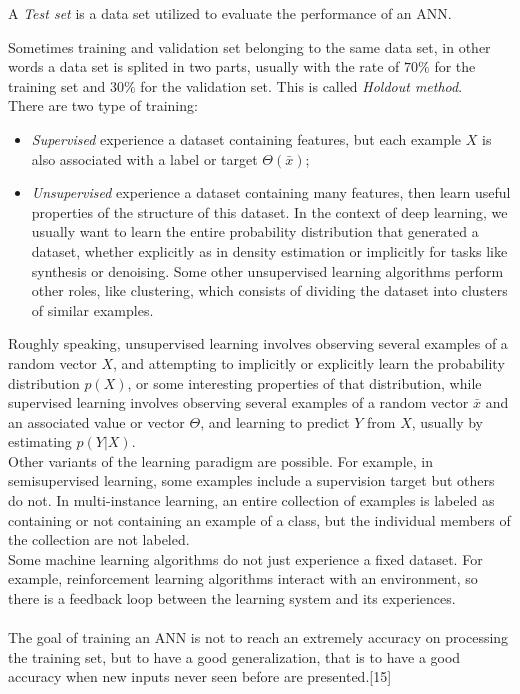 \begin{defn}
A \emph{Test set} is a data set utilized to evaluate the performance of an ANN.
\end{defn}

Sometimes training and validation set belonging to the same data set, in other words a data set is splited in two parts, usually with the rate of $70 \%$ for the training set and $30 \%$ for the validation set. This is called \emph{Holdout method}.\\



There are two type of training:
\begin{itemize}
\item \emph{Supervised} experience a dataset containing features, but each example $X$ is also associated with a label or target $\Theta(\bar{x})$;

\item \emph{Unsupervised} experience a dataset containing many features, then learn useful properties of the structure of this dataset. In the context of deep learning, we usually want to learn the entire probability distribution that generated a dataset, whether explicitly as in density estimation or implicitly for tasks like synthesis or denoising. Some other unsupervised learning algorithms perform other roles, like clustering, which consists of dividing the dataset into clusters of similar examples.
\end{itemize}

Roughly speaking, unsupervised learning involves observing several examples of a random vector $X$, and attempting to implicitly or explicitly learn the probability distribution $p(X)$, or some interesting properties of that distribution, while supervised learning involves observing several examples of a random vector $\bar{x}$ and an associated value or vector $\Theta$, and learning to predict $Y$ from $X$, usually by estimating $p(Y| X )$.\\
Other variants of the learning paradigm are possible. For example, in semisupervised learning, some examples include a supervision target but others do not. In multi-instance learning, an entire collection of examples is labeled as containing or not containing an example of a class, but the individual members of the collection are not labeled.\\
Some machine learning algorithms do not just experience a fixed dataset. For example, reinforcement learning algorithms interact with an environment, so there is a feedback loop between the learning system and its experiences. \\
{}\\
The goal of training an ANN is not to reach an extremely accuracy on processing the training set, but to have a good generalization, that is to have a good accuracy when new inputs never seen before are presented.[15]






